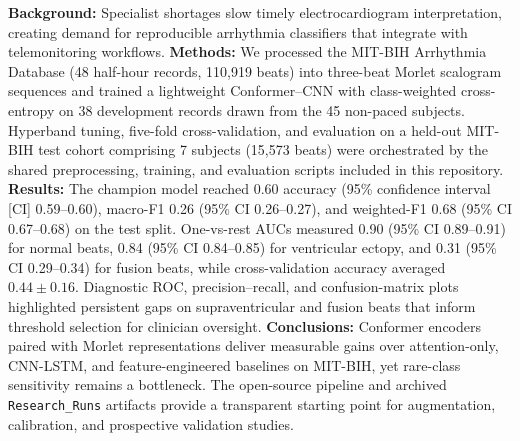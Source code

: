 \textbf{Background:} Specialist shortages slow timely electrocardiogram interpretation, creating demand for reproducible arrhythmia classifiers that integrate with telemonitoring workflows. \textbf{Methods:} We processed the MIT-BIH Arrhythmia Database (48 half-hour records, 110{,}919 beats) into three-beat Morlet scalogram sequences and trained a lightweight Conformer--CNN with class-weighted cross-entropy on 38 development records drawn from the 45 non-paced subjects. Hyperband tuning, five-fold cross-validation, and evaluation on a held-out MIT-BIH test cohort comprising 7 subjects (15{,}573 beats) were orchestrated by the shared preprocessing, training, and evaluation scripts included in this repository. \textbf{Results:} The champion model reached 0.60 accuracy (95\% confidence interval [CI] 0.59--0.60), macro-F1 0.26 (95\% CI 0.26--0.27), and weighted-F1 0.68 (95\% CI 0.67--0.68) on the test split. One-vs-rest AUCs measured 0.90 (95\% CI 0.89--0.91) for normal beats, 0.84 (95\% CI 0.84--0.85) for ventricular ectopy, and 0.31 (95\% CI 0.29--0.34) for fusion beats, while cross-validation accuracy averaged $0.44\pm0.16$. Diagnostic ROC, precision--recall, and confusion-matrix plots highlighted persistent gaps on supraventricular and fusion beats that inform threshold selection for clinician oversight. \textbf{Conclusions:} Conformer encoders paired with Morlet representations deliver measurable gains over attention-only, CNN-LSTM, and feature-engineered baselines on MIT-BIH, yet rare-class sensitivity remains a bottleneck. The open-source pipeline and archived \texttt{Research\_Runs} artifacts provide a transparent starting point for augmentation, calibration, and prospective validation studies.
